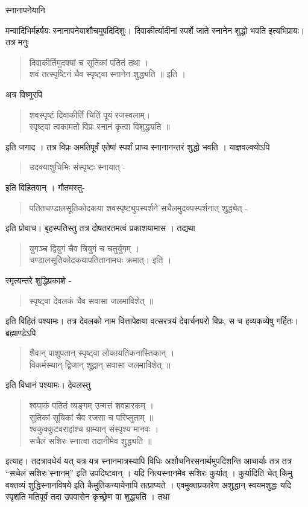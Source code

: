 स्नानापनेयानि \

मन्वादिभिर्महर्षयः स्नानापनेयाशौचमुपदिदिशुः। दिवाकीर्त्यादीनां स्पर्शे जाते स्नानेन शुद्धो भवति इत्यभिप्रायः। तत्र मनुः 
\begin{verse}
दिवाकीर्तिमुदक्यां च सूतिकां पतितं तथा ।\\
शवं तत्स्पृष्टिनं चैव स्पृष्ट्वा स्नानेन शुद्ध्यति ॥ इति । 
\end{verse}
अत्र विष्णुरपि 
\begin{verse}
शवस्पृष्टं दिवाकीर्तिं चितिं पूयं रजस्वलाम्।\\
स्पृष्ट्वा त्वकामतो विप्रः स्नानं कृत्वा विशुद्ध्यति ॥ 
\end{verse}
इति जगाद । तत्र विप्रः अमतिपूर्वं एतेषां स्पर्शं प्राप्य स्नानानन्तरं शुद्धो भवति । याज्ञवल्क्योऽपि 
\begin{verse}
उदक्याशुचिभिः संस्पृष्टः स्नायात् -
\end{verse}
इति विहितवान् । गौतमस्तु- 
\begin{verse}
पतितचण्डालसूतिकोदकया शवस्पृष्ट्युपस्पर्शने सचैलमुदक्पस्पर्शनात्  शुद्ध्येत् -
\end{verse}
इति प्रोवाच। बृहस्पतिस्तु तत्र दोषतरतमत्वं प्रकाशयामास । तद्यथा 
\begin{verse}
युगञ्च द्वियुगं चैव त्रियुगं च चतुर्युगम् । \\
चण्डालसूतिकोदकयापतितानामधः क्रमात्। इति । 
\end{verse}
स्मृत्यन्तरे शुद्धिप्रकाशे - 
\begin{verse}
स्पृष्ट्वा देवलकं चैव सवासा जलमाविशेत् ॥
\end{verse}
इति विहितं पश्यामः। तत्र देवलको नाम वित्तापेक्षया वत्सरत्रयं देवार्चनपरो विप्रः, स च हव्यकव्येषु गर्हितः। ब्रह्माण्डेऽपि 
\begin{verse}
शैवान् पाशुपतान् स्पृष्ट्वा लोकायतिकनास्तिकान् ।\\
विकर्मस्थान् द्विजान् शूद्रान् सवासा जलमाविशेत्  ॥ 
\end{verse}
इति विधानं पश्यामः।  देवलस्तु  
\begin{verse}
श्वपाकं पतितं व्यङ्गम् उन्मत्तं शवहारकम् । \\
सूतिकां सूयिकां चैव रजसा च परिप्लुताम् ॥ \\
श्वकुक्कुटवराहांश्च ग्राम्यान् संस्पृश्य मानवः । \\
सचैलं सशिरः स्नात्वा तदानीमेव शुद्ध्यति ॥
\end{verse}
इत्याह। तदत्रावधेयं यत् यत्र यत्र स्नानमात्रस्यापि विधिः अशौचनिरसनार्थमुपदिशन्ति आचार्याः तत्र तत्र “सचेलं सशिरः स्नानम्” इति उपदिष्टवान् । यदि नित्यस्नानमेव सशिरः कुर्यात् । कुर्यादिति चेत् किमु वक्तव्यं शुद्धिस्नानविषये इति कैमुतिकन्यायेनापि तत्प्राप्यते । एवमुक्तप्रकारेण अशुद्धान् स्वयमशुद्धः यदि स्पृशति मतिपूर्वं तदा उपवासेन कृच्छ्रेण वा शुद्ध्यति । तथा 
